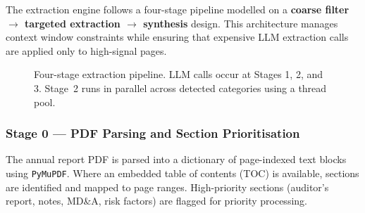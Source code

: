\documentclass[12pt,a4paper]{article}
\begin{document}
The extraction engine follows a four-stage pipeline modelled on a
\textbf{coarse filter $\rightarrow$ targeted extraction $\rightarrow$ synthesis} design.
This architecture manages context window constraints while ensuring that expensive
LLM extraction calls are applied only to high-signal pages.

\begin{figure}[H]
\centering
{}
\caption{Four-stage extraction pipeline. LLM calls occur at Stages 1, 2, and 3.
Stage~2 runs in parallel across detected categories using a thread pool.}
\end{figure}

\subsubsection{Stage 0 --- PDF Parsing and Section Prioritisation}

The annual report PDF is parsed into a dictionary of page-indexed text blocks using
\texttt{PyMuPDF}. Where an embedded table of contents (TOC) is available, sections
are identified and mapped to page ranges. High-priority sections (auditor's report,
notes, MD\&A, risk factors) are flagged for priority processing.
\end{document}
